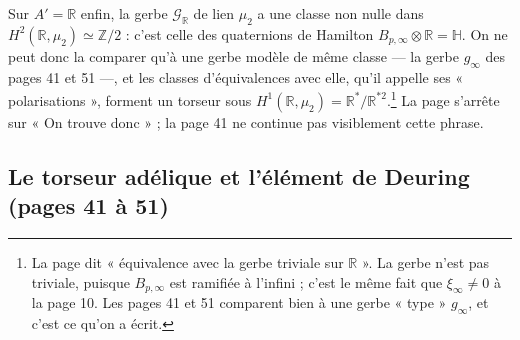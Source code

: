 \documentclass[11pt,a4paper]{article}
\begin{document}
Sur $A' = \mathbb{R}$ enfin, la gerbe $\mathcal{G}_{\mathbb{R}}$ de lien $\mu_{2}$
a une classe non nulle dans $H^{2}(\mathbb{R}, \mu_{2}) \simeq \mathbb{Z}/2$ :
c'est celle des quaternions de Hamilton $B_{p,\infty} \otimes \mathbb{R} =
\mathbb{H}$. On ne peut donc la comparer qu'à une gerbe modèle de même classe
--- la gerbe $g_{\infty}$ des pages 41 et 51 ---, et les classes d'équivalences
avec elle, qu'il appelle ses « polarisations », forment un torseur sous
$H^{1}(\mathbb{R}, \mu_{2}) = \mathbb{R}^{*}/\mathbb{R}^{*2}$.\footnote{La page dit
« équivalence avec la gerbe triviale sur $\mathbb{R}$ ». La gerbe n'est pas
triviale, puisque $B_{p,\infty}$ est ramifiée à l'infini ; c'est le même fait
que $\xi_{\infty} \neq 0$ à la page 10. Les pages 41 et 51 comparent bien à une
gerbe « type » $g_{\infty}$, et c'est ce qu'on a écrit.} La page s'arrête sur
« On trouve donc » ; la page 41 ne continue pas visiblement cette phrase.

\subsection*{Le torseur adélique et l'élément de Deuring (pages 41 à 51)}
\end{document}
